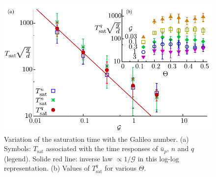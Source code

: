 \begin{figure}[H]
    \centering
    \includegraphics[width=0.75\linewidth]{04-figuras/TM-tRe.pdf}
    \caption[Saturation time $T_\textrm{sat}$ for the transport.]{Variation of the saturation time with the Galileo number. (a) Symbols: $T_\textrm{sat}$ associated with the time responses of $\bar{u}_p$, $n$ and $q$ (legend). Solide red line: inverse law $\propto 1/\mathcal{G}$ in this log-log representation. (b) Values of $T^q_\textrm{sat}$ for various $\Theta$.}
    \label{fig:TM_tsat}
\end{figure}

